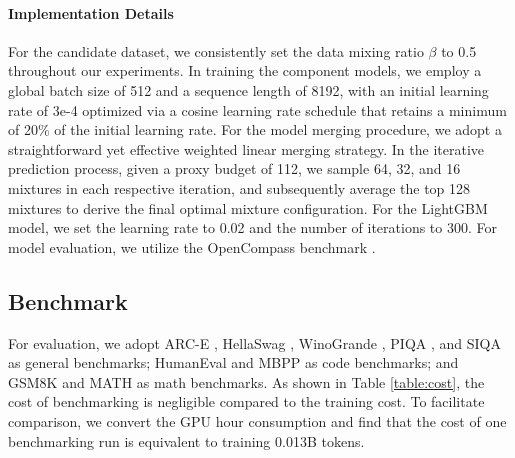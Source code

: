 \documentclass{article}
\theoremstyle{plain}
\theoremstyle{definition}
\theoremstyle{remark}
\newcommand{\comments}[1]{\textcolor{red}{#1}}
\begin{document}



\paragraph{Implementation Details}
For the candidate dataset, we consistently set the data mixing ratio $\beta$ to 0.5 throughout our experiments.
In training the component models, we employ a global batch size of 512 and a sequence length of 8192, with an initial learning rate of 3e-4 optimized via a cosine learning rate schedule that retains a minimum of 20\% of the initial learning rate.
For the model merging procedure, we adopt a straightforward yet effective weighted linear merging strategy.
In the iterative prediction process, given a proxy budget of 112, we sample 64, 32, and 16 mixtures in each respective iteration, and subsequently average the top 128 mixtures to derive the final optimal mixture configuration.
For the LightGBM model, we set the learning rate to 0.02 and the number of iterations to 300.
For model evaluation, we utilize the OpenCompass benchmark \cite{contributors2023opencompass}.


\subsection{Benchmark} 
For evaluation, we adopt ARC-E \cite{clark2018think}, HellaSwag \cite{zellers2019hellaswag}, WinoGrande \cite{sakaguchi2021winogrande}, PIQA \cite{bisk2020piqa}, and SIQA \cite{sap2019socialiqa} as general benchmarks; HumanEval \cite{chen2021evaluating} and MBPP \cite{austin2021program} as code benchmarks; and GSM8K \cite{cobbe2021training} and MATH \cite{hendrycks2021measuring} as math benchmarks. As shown in Table \ref{table:cost}, the cost of benchmarking is negligible compared to the training cost. To facilitate comparison, we convert the GPU hour consumption and find that the cost of one benchmarking run is equivalent to training 0.013B tokens.
\end{document}
